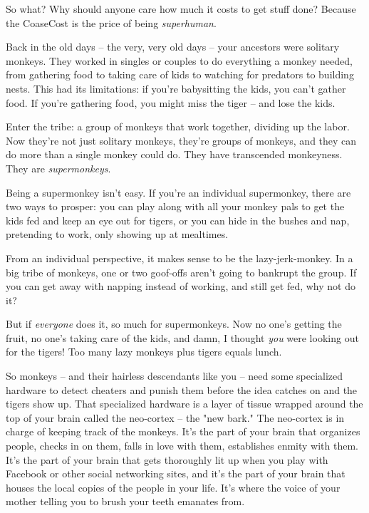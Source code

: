So what? Why should anyone care how much it costs to get stuff
done? Because the CoaseCost is the price of being
\emph{superhuman}.

Back in the old days -- the very, very old days -- your ancestors
were solitary monkeys. They worked in singles or couples to do
everything a monkey needed, from gathering food to taking care of
kids to watching for predators to building nests. This had its
limitations: if you're babysitting the kids, you can't gather food.
If you're gathering food, you might miss the tiger -- and lose the
kids.

Enter the tribe: a group of monkeys that work together, dividing up
the labor. Now they're not just solitary monkeys, they're groups of
monkeys, and they can do more than a single monkey could do. They
have transcended monkeyness. They are \emph{supermonkeys}.

Being a supermonkey isn't easy. If you're an individual
supermonkey, there are two ways to prosper: you can play along with
all your monkey pals to get the kids fed and keep an eye out for
tigers, or you can hide in the bushes and nap, pretending to work,
only showing up at mealtimes.

From an individual perspective, it makes sense to be the
lazy-jerk-monkey. In a big tribe of monkeys, one or two goof-offs
aren't going to bankrupt the group. If you can get away with
napping instead of working, and still get fed, why not do it?

But if \emph{everyone} does it, so much for supermonkeys. Now no
one's getting the fruit, no one's taking care of the kids, and
damn, I thought \emph{you} were looking out for the tigers! Too
many lazy monkeys plus tigers equals lunch.

So monkeys -- and their hairless descendants like you -- need some
specialized hardware to detect cheaters and punish them before the
idea catches on and the tigers show up. That specialized hardware
is a layer of tissue wrapped around the top of your brain called
the neo-cortex -- the "new bark." The neo-cortex is in charge of
keeping track of the monkeys. It's the part of your brain that
organizes people, checks in on them, falls in love with them,
establishes enmity with them. It's the part of your brain that gets
thoroughly lit up when you play with Facebook or other social
networking sites, and it's the part of your brain that houses the
local copies of the people in your life. It's where the voice of
your mother telling you to brush your teeth emanates from.

